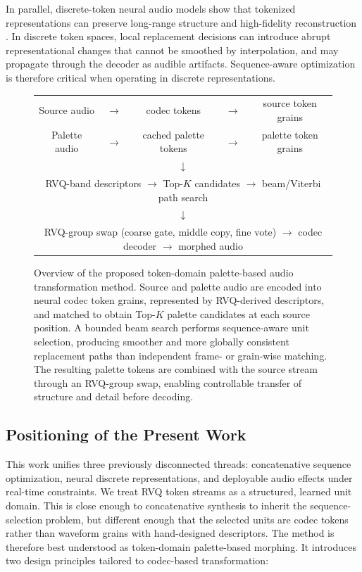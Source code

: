 \documentclass[twoside,a4paper]{article}
\begin{document}
In parallel, discrete-token neural audio models show that tokenized representations can preserve long-range structure and high-fidelity reconstruction \cite{vanDenOord:2017:VQVAE,Dhariwal:2020:Jukebox,Borsos:2022:AudioLM,Agostinelli:2023:MusicLM}. In discrete token spaces, local replacement decisions can introduce abrupt representational changes that cannot be smoothed by interpolation, and may propagate through the decoder as audible artifacts. Sequence-aware optimization is therefore critical when operating in discrete representations.


\begin{figure}[ht]
    \centering
    \scriptsize
    \setlength{\tabcolsep}{4pt}
    \begin{tabular}{c c c c c}
    Source audio & $\rightarrow$ & codec tokens & $\rightarrow$ & source token grains \\
    Palette audio & $\rightarrow$ & cached palette tokens & $\rightarrow$ & palette token grains \\
    \multicolumn{5}{c}{$\downarrow$} \\
    \multicolumn{5}{c}{RVQ-band descriptors $\rightarrow$ Top-$K$ candidates $\rightarrow$ beam/Viterbi path search} \\
    \multicolumn{5}{c}{$\downarrow$} \\
    \multicolumn{5}{c}{RVQ-group swap (coarse gate, middle copy, fine vote) $\rightarrow$ codec decoder $\rightarrow$ morphed audio} \\
    \end{tabular}
    \caption{Overview of the proposed token-domain palette-based audio transformation method. Source and palette audio are encoded into neural codec token grains, represented by RVQ-derived descriptors, and matched to obtain Top-$K$ palette candidates at each source position. A bounded beam search performs sequence-aware unit selection, producing smoother and more globally consistent replacement paths than independent frame- or grain-wise matching. The resulting palette tokens are combined with the source stream through an RVQ-group swap, enabling controllable transfer of structure and detail before decoding.}
    \label{fig:pipeline}
\end{figure}

\subsection{Positioning of the Present Work}

This work unifies three previously disconnected threads: concatenative sequence optimization, neural discrete representations, and deployable audio effects under real-time constraints. We treat RVQ token streams as a structured, learned unit domain. This is close enough to concatenative synthesis to inherit the sequence-selection problem, but different enough that the selected units are codec tokens rather than waveform grains with hand-designed descriptors. The method is therefore best understood as token-domain palette-based morphing. It introduces two design principles tailored to codec-based transformation:
\end{document}
